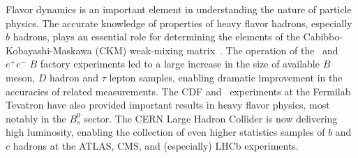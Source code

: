 %

\label{sec:intro}

Flavor dynamics is an important element in understanding the nature of
particle physics.  The accurate knowledge of properties of heavy flavor
hadrons, especially $b$ hadrons, plays an essential role for
determining the elements of the Cabibbo-Kobayashi-Maskawa (CKM)
weak-mixing matrix~\cite{Cabibbo:1963yz,Kobayashi:1973fv}. 
The operation of the \belle\ and \babar\ $e^+e^-$ $B$ factory 
experiments led to a large increase in the size of available 
$B$ meson, $D$ hadron and $\tau$ lepton samples, 
enabling dramatic improvement in the accuracies of related measurements.
The CDF and \dzero\ experiments at the Fermilab Tevatron 
have also provided important results in heavy flavor physics,
most notably in the $B^0_s$ sector.
The CERN Large Hadron Collider is now delivering high luminosity, 
enabling the collection of even higher statistics samples of $b$ 
and $c$ hadrons at the ATLAS, CMS, and (especially) LHCb experiments.
 
